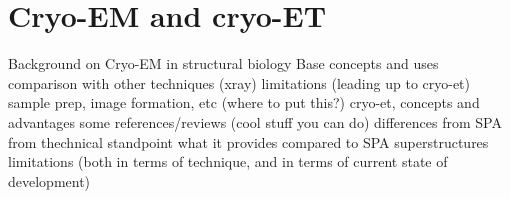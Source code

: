 \chapter{Cryo-EM and cryo-ET}

\begin{outline}
\1 Background on Cryo-EM in structural biology
    \2 Base concepts and uses
    \2 comparison with other techniques (xray)
    \2 limitations (leading up to cryo-et)
        \3 sample prep, image formation, etc (where to put this?)
\1 cryo-et, concepts and advantages
    \2 some references/reviews (cool stuff you can do)
        \3 differences from SPA from thechnical standpoint
    \2 what it provides compared to SPA
    \2 superstructures
    \2 limitations (both in terms of technique, and in terms of current state of development)
\end{outline}

